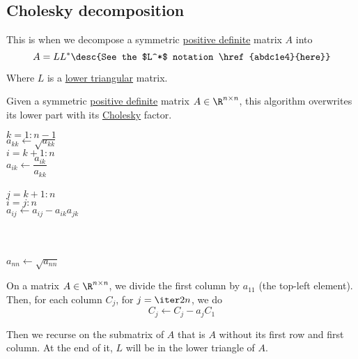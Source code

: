 \subsection{Cholesky decomposition}\label{bf9439e}

\label{c9f2a5d}

This is when we decompose a symmetric \href{e25e722}{positive definite} matrix
$A$ into
$$
  A=LL^*\desc{See the $L^*$ notation \href{abdc1e4}{here}}
$$

Where $L$ is a \href{ce94591}{lower triangular} matrix.

\label{ca32d2b}

Given a symmetric \href{e25e722}{positive definite} matrix $A\in\R^{n\times
n}$, this algorithm overwrites its lower part with its \href{c9f2a5d}{Cholesky}
factor.

\begin{pseudocode} %
  \For $k=1:n-1$ \\
  \tab $a_{kk}\gets\sqrt{a_{kk}}$ \\
  \tab\For $i=k+1:n$ \\[0.5em]
  \tab\tab $a_{ik}\gets\dfrac{a_{ik}}{a_{kk}}$ \\[0.5em]
  \tab\End \\
  \tab\For $j=k+1:n$ \\
  \tab\tab\For $i=j:n$ \\
  \tab\tab\tab $a_{ij}\gets a_{ij}-a_{ik}a_{jk}$ \\
  \tab\tab\End \\
  \tab\End \\
  \End \\
  $a_{nn}\gets\sqrt{a_{nn}}$
\end{pseudocode}

\label{c201099}

On a matrix $A\in\R^{n\times n}$, we divide the first column by $a_{11}$ (the
top-left element). Then, for each column $C_j$, for $j=\iter2n$, we do
$$
  C_j\gets C_j-a_jC_1
$$

Then we recurse on the submatrix of $A$ that is $A$ without its first row and
first column. At the end of it, $L$ will be in the lower triangle of $A$.

